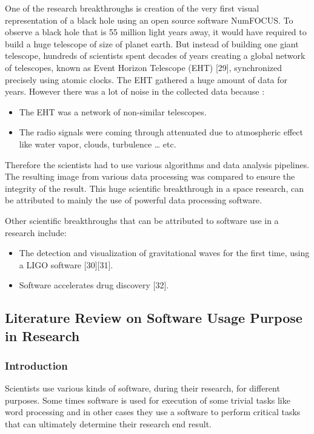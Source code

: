 \documentclass[12pt, a4paper]{article}
\begin{document}
One of the research breakthroughs is creation of the very first visual representation of a black hole using an open source software NumFOCUS. To observe a black hole that is 55 million light years away, it would have required to build a huge telescope of size of planet earth. But instead of building one giant telescope, hundreds of scientists spent decades of years creating a global network of telescopes, known as Event Horizon Telescope (EHT) [29], synchronized precisely using atomic clocks. The EHT gathered a huge amount of data for years. However there was a lot of noise in the collected data because :
	\vspace{-1mm}   %
	\begin{itemize}[noitemsep,topsep=5pt, leftmargin=0.5in] %
		\item The EHT was a network of non-similar telescopes.
		\item The radio signals were coming through attenuated due to atmospheric effect like water vapor, clouds, turbulence … etc.
	\end{itemize}
Therefore the scientists had to use various algorithms and data analysis pipelines. The resulting image from various data processing was compared to ensure the integrity of the result. This huge scientific breakthrough in a space research, can be attributed to mainly the use of powerful data processing software. 

Other scientific breakthroughs that can be attributed to software use in a research include:

	\vspace{-1mm}   %
	\begin{itemize}[noitemsep,topsep=5pt, leftmargin=0.5in] %
		\item The detection and visualization of gravitational waves for the first time, using a LIGO software [30][31]. 
		\item Software accelerates drug discovery [32].
	\end{itemize}


\subsection{Literature Review on Software Usage Purpose in Research }
\subsubsection{Introduction}
Scientists use various kinds of software, during their research, for different purposes. Some times software is used for execution of some trivial tasks like word processing and in other cases they use a software to perform critical tasks that can ultimately determine their research end result. 
\end{document}
